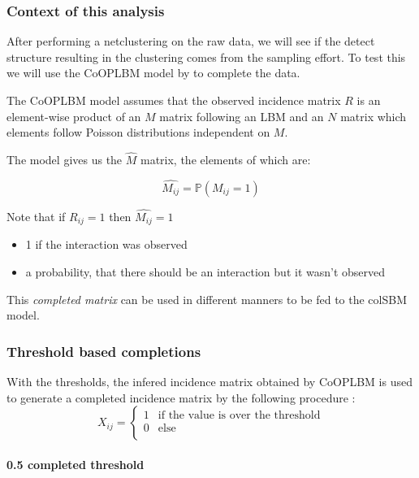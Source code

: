 \hypertarget{context-of-this-analysis}{%
\subsubsection{Context of this
analysis}\label{context-of-this-analysis}}

After performing a netclustering on the raw data, we will see if the
detect structure resulting in the clustering comes from the sampling
effort. To test this we will use the CoOPLBM model by
\cite{anakokDisentanglingStructureEcological2022} to complete the data.

The CoOPLBM model assumes that the observed incidence matrix \(R\) is an
element-wise product of an \(M\) matrix following an LBM and an \(N\)
matrix which elements follow Poisson distributions independent on \(M\).

The model gives us the \(\widehat{M}\) matrix, the elements of which
are:

\[\widehat{M_{ij}} = \mathbb{P}(M_{ij} = 1)\]

Note that if \(R_{ij} = 1\) then \(\widehat{M_{ij}} = 1\)

\begin{itemize}
\tightlist
\item
  1 if the interaction was observed
\item
  a probability, that there should be an interaction but it wasn't
  observed
\end{itemize}

This \emph{completed matrix} can be used in different manners to be fed
to the colSBM model.

\hypertarget{threshold-based-completions}{%
\subsubsection{Threshold based
completions}\label{threshold-based-completions}}

With the thresholds, the infered incidence matrix obtained by CoOPLBM is
used to generate a completed incidence matrix by the following procedure
: \[X_{ij} = \begin{cases}
  1 & \text{if the value is over the threshold} \\
  0 & \text{else} \\
\end{cases}\]

\hypertarget{completed-threshold}{%
\paragraph{0.5 completed threshold}\label{completed-threshold}}


